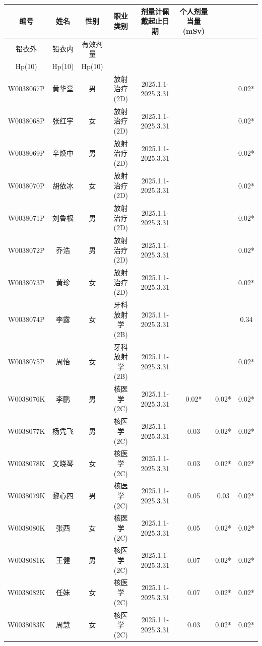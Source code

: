 \begin{table}[H]
\centering
\begin{tabular}{|c|c|c|c|c|c|c|c|}
\hline
编号 & 姓名 & 性别 & 职业类别 & 剂量计佩戴起止日期 & 个人剂量当量(mSv) &  &  \\
\hline
铅衣外 & 铅衣内 & 有效剂量 &  &  &  &  &  \\
\hline
Hp(10) & Hp(10) & Hp(10) &  &  &  &  &  \\
\hline
W0038067P & 黄华堂 & 男 & 放射治疗(2D) & 2025.1.1-2025.3.31 &  &  & 0.02* \\
\hline
W0038068P & 张红宇 & 女 & 放射治疗(2D) & 2025.1.1-2025.3.31 &  &  & 0.02* \\
\hline
W0038069P & 辛焕中 & 男 & 放射治疗(2D) & 2025.1.1-2025.3.31 &  &  & 0.02* \\
\hline
W0038070P & 胡依冰 & 女 & 放射治疗(2D) & 2025.1.1-2025.3.31 &  &  & 0.02* \\
\hline
W0038071P & 刘鲁根 & 男 & 放射治疗(2D) & 2025.1.1-2025.3.31 &  &  & 0.02* \\
\hline
W0038072P & 乔浩 & 男 & 放射治疗(2D) & 2025.1.1-2025.3.31 &  &  & 0.02* \\
\hline
W0038073P & 黄珍 & 女 & 放射治疗(2D) & 2025.1.1-2025.3.31 &  &  & 0.02* \\
\hline
W0038074P & 李露 & 女 & 牙科放射学(2B) & 2025.1.1-2025.3.31 &  &  & 0.34 \\
\hline
W0038075P & 周怡 & 女 & 牙科放射学(2B) & 2025.1.1-2025.3.31 &  &  & 0.02* \\
\hline
W0038076K & 李鹏 & 男 & 核医学(2C) & 2025.1.1-2025.3.31 & 0.02* & 0.02* & 0.02* \\
\hline
W0038077K & 杨凭飞 & 男 & 核医学(2C) & 2025.1.1-2025.3.31 & 0.03 & 0.02* & 0.02* \\
\hline
W0038078K & 文晓琴 & 女 & 核医学(2C) & 2025.1.1-2025.3.31 & 0.03 & 0.02* & 0.02* \\
\hline
W0038079K & 黎心四 & 男 & 核医学(2C) & 2025.1.1-2025.3.31 & 0.05 & 0.03 & 0.02* \\
\hline
W0038080K & 张西 & 女 & 核医学(2C) & 2025.1.1-2025.3.31 & 0.05 & 0.02* & 0.02* \\
\hline
W0038081K & 王健 & 男 & 核医学(2C) & 2025.1.1-2025.3.31 & 0.07 & 0.02* & 0.02* \\
\hline
W0038082K & 任妹 & 女 & 核医学(2C) & 2025.1.1-2025.3.31 & 0.07 & 0.02* & 0.02* \\
\hline
W0038083K & 周慧 & 女 & 核医学(2C) & 2025.1.1-2025.3.31 & 0.03 & 0.02* & 0.02* \\

\end{tabular}
\end{table}

